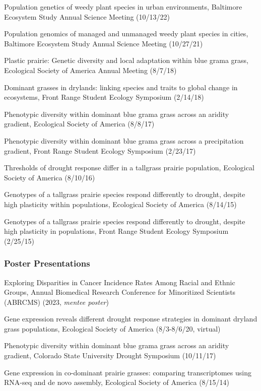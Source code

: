 \documentclass{cv}
\begin{document}
Population genetics of weedy plant species in urban environments, Baltimore Ecosystem Study Annual Science Meeting (10/13/22)

Population genomics of managed and unmanaged weedy plant species in cities, Baltimore Ecosystem Study Annual Science Meeting (10/27/21)

Plastic prairie: Genetic diversity and local adaptation within blue grama grass, Ecological Society of America Annual Meeting (8/7/18)

Dominant grasses in drylands: linking species and traits to global change in ecosystems, Front Range Student Ecology Symposium (2/14/18)

Phenotypic diversity within dominant blue grama grass across an aridity gradient, Ecological Society of America (8/8/17)

Phenotypic diversity within dominant blue grama grass across a precipitation gradient, Front Range Student Ecology Symposium (2/23/17)

Thresholds of drought response differ in a tallgrass prairie population, Ecological Society of America (8/10/16)

Genotypes of a tallgrass prairie species respond differently to drought, despite high plasticity within populations, Ecological Society of America (8/14/15)

Genotypes of a tallgrass prairie species respond differently to drought, despite high plasticity in populations, Front Range Student Ecology Symposium (2/25/15)

\subsubsection*{Poster Presentations}

Exploring Disparities in Cancer Incidence Rates Among Racial and Ethnic Groups, Annual Biomedical Research Conference for Minoritized Scientists (ABRCMS) (2023, \textit{mentee poster})

Gene expression reveals different drought response strategies in dominant dryland grass populations, Ecological Society of America (8/3-8/6/20, virtual)

Phenotypic diversity within dominant blue grama grass across an aridity gradient, Colorado State University Drought Symposium (10/11/17)

Gene expression in co-dominant prairie grasses: comparing transcriptomes using RNA-seq and de novo assembly, Ecological Society of America (8/15/14)
\end{document}
